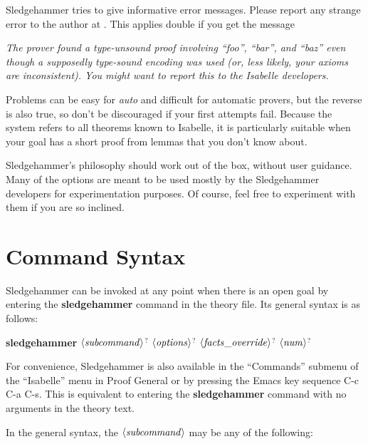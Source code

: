 \documentclass[a4paper,12pt]{article}
\def\qty#1{\ensuremath{\left<\mathit{#1\/}\right>}}
\begin{document}

Sledgehammer tries to give informative error messages. Please report any strange
error to the author at \authoremail. This applies double if you get the message

\prew
\slshape
The prover found a type-unsound proof involving ``\textit{foo}'',
``\textit{bar}'', and ``\textit{baz}'' even though a supposedly type-sound
encoding was used (or, less likely, your axioms are inconsistent). You might
want to report this to the Isabelle developers.
\postw


Problems can be easy for \textit{auto} and difficult for automatic provers, but
the reverse is also true, so don't be discouraged if your first attempts fail.
Because the system refers to all theorems known to Isabelle, it is particularly
suitable when your goal has a short proof from lemmas that you don't know about.


Sledgehammer's philosophy should work out of the box, without user guidance.
Many of the options are meant to be used mostly by the Sledgehammer developers
for experimentation purposes. Of course, feel free to experiment with them if
you are so inclined.

\section{Command Syntax}
\label{command-syntax}

Sledgehammer can be invoked at any point when there is an open goal by entering
the \textbf{sledgehammer} command in the theory file. Its general syntax is as
follows:

\prew
\textbf{sledgehammer} \qty{subcommand}$^?$ \qty{options}$^?$ \qty{facts\_override}$^?$ \qty{num}$^?$
\postw

For convenience, Sledgehammer is also available in the ``Commands'' submenu of
the ``Isabelle'' menu in Proof General or by pressing the Emacs key sequence C-c
C-a C-s. This is equivalent to entering the \textbf{sledgehammer} command with
no arguments in the theory text.

In the general syntax, the \qty{subcommand} may be any of the following:
\end{document}
